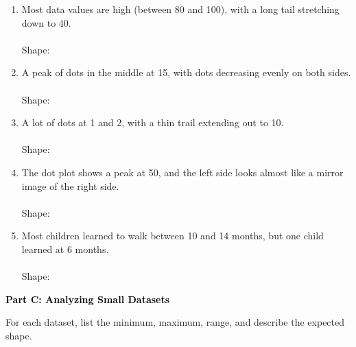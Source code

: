 \documentclass[12pt, letterpaper, fleqn]{article}
\newcommand{\blanklong}{\underline{\hspace{6.5cm}}}
\begin{document}
\vspace{5mm}

\begin{enumerate}[itemsep=1.5cm, leftmargin=0.6cm]
\item Most data values are high (between 80 and 100), with a long tail stretching down to 40. \\ \\
Shape: \blanklong

\item A peak of dots in the middle at 15, with dots decreasing evenly on both sides. \\ \\
Shape: \blanklong

\item A lot of dots at 1 and 2, with a thin trail extending out to 10. \\ \\
Shape: \blanklong

\item The dot plot shows a peak at 50, and the left side looks almost like a mirror image of the right side. \\ \\
Shape: \blanklong

\item Most children learned to walk between 10 and 14 months, but one child learned at 6 months. \\ \\
Shape: \blanklong
\end{enumerate}

\newpage

\begin{tcolorbox}[colback=black!10]
    \large\textcolor{black}{\textbf{Part C: Analyzing Small Datasets}}
\end{tcolorbox}

\vspace{3mm}

\noindent
For each dataset, list the minimum, maximum, range, and describe the expected shape.

\vspace{5mm}
\end{document}
